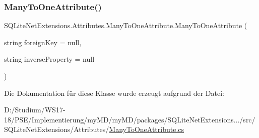 \subsubsection{\texorpdfstring{Many\+To\+One\+Attribute()}{ManyToOneAttribute()}}
{\footnotesize\ttfamily S\+Q\+Lite\+Net\+Extensions.\+Attributes.\+Many\+To\+One\+Attribute.\+Many\+To\+One\+Attribute (\begin{DoxyParamCaption}\item[{string}]{foreign\+Key = {\ttfamily null},  }\item[{string}]{inverse\+Property = {\ttfamily null} }\end{DoxyParamCaption})}



Die Dokumentation für diese Klasse wurde erzeugt aufgrund der Datei\+:\begin{DoxyCompactItemize}
\item 
D\+:/\+Studium/\+W\+S17-\/18/\+P\+S\+E/\+Implementierung/my\+M\+D/my\+M\+D/packages/\+S\+Q\+Lite\+Net\+Extensions.../src/\+S\+Q\+Lite\+Net\+Extensions/\+Attributes/\mbox{\hyperlink{_many_to_one_attribute_8cs}{Many\+To\+One\+Attribute.\+cs}}\end{DoxyCompactItemize}
